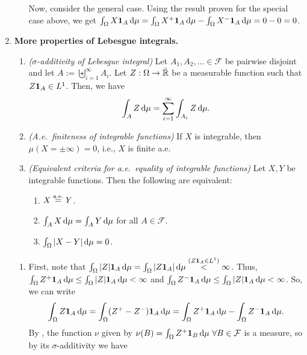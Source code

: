 \begin{enumerate}
\begin{pf}
\begin{enumerate}
Now, consider the general case. Using the result proven for the special case
above, we get \(\int_{\Omega}^{}X\indic_{A}\odif{\mu}=\int_{\Omega}^{}X^{+}\indic_{A}\odif{\mu}
-\int_{\Omega}^{}X^{-}\indic_{A}\odif{\mu}=0-0=0\).
\end{enumerate}
\end{pf}
\item \textbf{More properties of Lebesgue integrals.}
\begin{enumerate}
\item\label{it:leb-int-sig-add} \emph{(\(\sigma\)-additivity of Lebesgue integral)} Let
\(A_1,A_2,\dotsc\in\mathcal{F}\) be pairwise disjoint and let
\(A:=\biguplus_{i=1}^{\infty}A_i\). Let \(Z:\Omega\to\bar{\mathbb{R}}\) be a measurable
function such that \(Z\mathbf{1}_{A}\in L^{1}\). Then, we have
\[
\int_{A}^{}Z\odif{\mu}=\sum_{i=1}^{\infty}\int_{A_i}^{}Z\odif{\mu}.
\]
\item\label{it:leb-int-ae-fin} \emph{(A.e.\ finiteness of integrable functions)} If \(X\) is integrable,
then \(\mu(X=\pm\infty)=0\), i.e., \(X\) is finite a.e.
\item\label{it:equiv-ae-equal-int-fn} \emph{(Equivalent criteria for a.e.\
equality of integrable functions)} Let \(X,Y\) be integrable functions. Then
the following are equivalent:
\begin{enumerate}
\item \(X\overset{\text{a.e.}}= Y\).
\item \(\int_{A}^{}X\odif{\mu}=\int_{A}^{}Y\odif{\mu}\) for all \(A\in\mathcal{F}\).
\item \(\int_{\Omega}^{}|X-Y|\odif{\mu}=0\).
\end{enumerate}
\end{enumerate}
\begin{pf}
\begin{enumerate}
\item First, note that \(\int_{\Omega}^{}|Z|\indic_{A}\odif{\mu}= \int_{\Omega}^{}|Z\indic_{A}|\odif{\mu}
\overset{(Z\indic_{A}\in L^{1})}{<}\infty\). Thus, \(\int_{\Omega}^{}Z^{+}\indic_{A}\odif{\mu}
\le\int_{\Omega}^{}|Z|\indic_{A}\odif{\mu}<\infty\) and
\(\int_{\Omega}^{}Z^{-}\indic_{A}\odif{\mu}
\le\int_{\Omega}^{}|Z|\indic_{A}\odif{\mu}<\infty\). So, we can write
\[
\int_{\Omega}^{}Z\indic_{A}\odif{\mu}=\int_{\Omega}^{}(Z^{+}-Z^{-})\indic_{A}\odif{\mu}
=\int_{\Omega}^{}Z^{+}\indic_{A}\odif{\mu}-\int_{\Omega}^{}Z^{-}\indic_{A}\odif{\mu}.
\]
By , the function \(\nu\) given by
\(\nu(B)=\int_{\Omega}^{}Z^{+}\indic_{B}\odif{\mu}~\forall B\in\mathcal{F}\) is
a measure, so by its \(\sigma\)-additivity we have

\end{enumerate}
\end{pf}
\end{enumerate}

